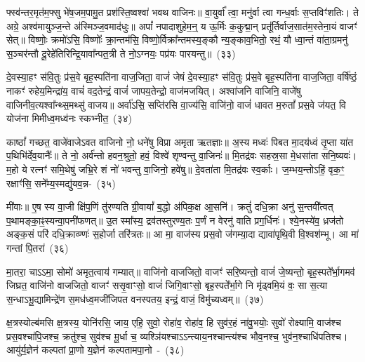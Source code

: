 फ्स्व॑न्तर॒मृत॑म॒फ्सु भे॑ष॒जम॒पामु॒त प्रश॑स्ति॒ष्वश्वा॑ भवथ वाजिनः॥ वा॒युर्वा᳚ त्वा॒ मनु॑र्वा त्वा गन्ध॒र्वाः स॒प्तविꣳ॑शतिः। ते अग्रे॒ अश्व॑मायुञ्ज॒न्ते अ॑स्मिञ्ज॒वमाद॑धुः॥ अपां᳚ नपादाशुहेम॒न्॒ य ऊ॒र्मिः क॒कुद्मा॒न् प्रतू᳚र्तिर्वाज॒सात॑म॒स्तेना॒यं वाजꣳ॑ सेत्॥ विष्णोः॒ क्रमो॑\-ऽसि॒ विष्णोः᳚ क्रा॒न्तम॑सि॒ विष्णो॒र्विक्रा᳚न्तमस्य॒ङ्कौ न्य॒ङ्काव॒भितो॒ रथं॒ यौ ध्वा॒न्तं वा॑ता॒ग्रमनु॑ स॒ञ्चर॑न्तौ दू॒रेहे॑तिरिन्द्रि॒यावा᳚न्पत॒त्री ते नो॒\-ऽग्नयः॒ पप्र॑यः पारयन्तु॥~(३३)

{\anuvakamend[{अ॒फ्सु न्य॒ङ्कौ पञ्च॑दश च}]}%

दे॒वस्या॒हꣳ स॑वि॒तुः प्र॑स॒वे बृह॒स्पति॑ना वाज॒जिता॒ वाजं॑ जेषं दे॒वस्या॒हꣳ स॑वि॒तुः प्र॑स॒वे बृह॒स्पति॑ना वाज॒जिता॒ वर्\mbox{}षि॑ष्ठं॒ नाकꣳ॑ रुहेय॒मिन्द्रा॑य॒ वाचं॑ वद॒तेन्द्रं॒ वाजं॑ जापय॒तेन्द्रो॒ वाज॑मजयित्। अश्वा॑जनि वाजिनि॒ वाजे॑षु वाजिनीव॒त्यश्वा᳚न्थ्स॒मथ्सु॑ वाजय॥ अर्वा॑\-ऽसि॒ सप्ति॑रसि वा॒ज्य॑सि॒ वाजि॑नो॒ वाजं॑ धावत म॒रुतां᳚ प्रस॒वे ज॑यत॒ वि योज॑ना मिमीध्व॒मध्व॑नः स्कभ्नीत॒~(३४)

काष्ठां᳚ गच्छत॒ वाजे॑वाजे\-ऽवत वाजिनो नो॒ धने॑षु विप्रा अमृता ऋतज्ञाः॥ अ॒स्य मध्वः॑ पिबत मा॒दय॑ध्वं तृ॒प्ता या॑त प॒थिभि॑र्देव॒यानैः᳚॥ ते नो॒ अर्व॑न्तो हवन॒श्रुतो॒ हवं॒ विश्वे॑ शृण्वन्तु वा॒जिनः॑॥ मि॒तद्र॑वः सहस्र॒सा मे॒धसा॑ता सनि॒ष्यवः॑। म॒हो ये रत्नꣳ॑ समि॒थेषु॑ जभ्रि॒रे शं नो॑ भवन्तु वा॒जिनो॒ हवे॑षु॥ दे॒वता॑ता मि॒तद्र॑वः स्व॒र्काः। ज॒म्भय॒न्तो\-ऽहिं॒ वृक॒ꣳ॒ रक्षाꣳ॑सि॒ सने᳚म्य॒स्मद्यु॑यव॒न्न-~(३५)

मी॑वाः॥ ए॒ष स्य वा॒जी क्षि॑प॒णिं तु॑रण्यति ग्री॒वायां᳚ ब॒द्धो अ॑पिक॒क्ष आ॒सनि॑। क्रतुं॑ दधि॒क्रा अनु॑ स॒न्तवी᳚त्वत् प॒थामङ्का॒ꣴ॒स्यन्वा॒पनी॑फणत्॥ उ॒त स्मा᳚स्य॒ द्रव॑तस्तुरण्य॒तः प॒र्णं न वेरनु॑ वाति प्रग॒र्धिनः॑। श्ये॒नस्ये॑व॒ ध्रज॑तो अङ्क॒सं परि॑ दधि॒क्राव्ण्णः॑ स॒होर्जा तरि॑त्रतः॥ आ मा॒ वाज॑स्य प्रस॒वो ज॑गम्या॒दा द्यावा॑\-पृथि॒वी वि॒श्वश॑म्भू। आ मा॑ गन्तां पि॒तरा॑~(३६)

मा॒तरा॒ चा\-ऽऽ\-मा॒ सोमो॑ अमृत॒त्वाय॑ गम्यात्॥ वाजि॑नो वाजजितो॒ वाजꣳ॑ सरि॒ष्यन्तो॒ वाजं॑ जे॒ष्यन्तो॒ बृह॒स्पते᳚र्भा॒गमव॑ जिघ्रत॒ वाजि॑नो वाजजितो॒ वाजꣳ॑ ससृ॒वाꣳसो॒ वाजं॑ जिगि॒वाꣳसो॒ बृह॒स्पते᳚र्भा॒गे नि मृ॑ढ्वमि॒यं वः॒ सा स॒त्या स॒न्धा\-ऽभू॒द्यामिन्द्रे॑ण स॒मध॑ध्व॒मजी॑जिपत वनस्पतय॒ इन्द्रं॒ वाजं॒ विमु॑च्यध्वम्॥~(३७)

{\anuvakamend[{स्क॒भ्नी॒त॒ यु॒य॒व॒न्पि॒तरा॒ द्विच॑त्वारिꣳशच्च}]}%

क्ष॒त्रस्योल्ब॑मसि क्ष॒त्रस्य॒ योनि॑रसि॒ जाय॒ एहि॒ सुवो॒ रोहा॑व॒ रोहा॑व॒ हि सुव॑र॒हं ना॑वु॒भयोः॒ सुवो॑ रोक्ष्यामि॒ वाज॑श्च प्रस॒वश्चा॑पि॒जश्च॒ क्रतु॑श्च॒ सुव॑श्च मू॒र्धा च॒ व्यश्ञि॑यश्चा\-ऽऽ\-न्त्याय॒नश्चान्त्य॑श्च भौव॒नश्च॒ भुव॑न॒श्चाधि॑\-पतिश्च। आयु॑र्य॒ज्ञेन॑ कल्पतां प्रा॒णो य॒ज्ञेन॑ कल्पतामपा॒नो~-~(३८)

